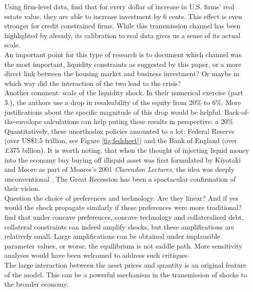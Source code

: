\documentclass{amsart}
\theoremstyle{definition}
\theoremstyle{remark}
\numberwithin{equation}{section}
\begin{document}
Using firm-level data, \cite{chaney2012collateral} find that for every dollar of increase in U.S. firms' real estate value, they are able to increase investment by 6 cents. This effect is even stronger for credit constrained firms. While this transmission channel has been highlighted by \cite{kiyotaki1997credit} already, its calibration to real data gives us a sense of its actual scale. \\

An important point for this type of research is to document which channel was the most important, liquidity constraints as suggested by this paper, or a more direct link between the housing market and business investment? Or maybe in which way did the interaction of the two lead to the crisis?\\

Another comment: scale of the liquidity shock. In their numerical exercise (part 3.), the authors use a drop in resaleability of the equity from 20\% to 6\%. More justifications about the specific magnitude of this drop would be helpful. Back-of-the-envelope calculations can help puting these results in perspective: a 20\% \\

Quantitatively, these unorthodox policies amounted to a lot: Federal Reserve (over US\$1.5 trillion, see Figure \ref{fig:fedsheet}) and the Bank of England (over £375 billion). It is worth noting, that when the thought of injecting liquid money into the economy buy buying off illiquid asset was first formulated by Kiyotaki and Moore as part of Moores's 2001 \textit{Clarendon Lectures}, the idea was deeply unconventional \citep{kiyotaki2001liquidity}. The Great Recession has been a spactacular confirmation of their vision.\\

Question the choice of preferences and technology. Are they linear? And if yes would the shock propagate similarly if these preferences were more traditional? \cite{cordoba2004credit} find that under concave preferences, concave technology and collateralised debt, collateral constraints can indeed amplify shocks, but these amplifications are relatively small. Large amplifications can be obtained under implausible parameter values, or worse, the equilibrium is not saddle path. More sensitivity analyses would have been welcomed to address such critiques.\\

The large interaction between the asset prices and quantity is an original feature of the model. This can be a powerful mechanism in the transmission of shocks to the broader economy.\\
\end{document}
